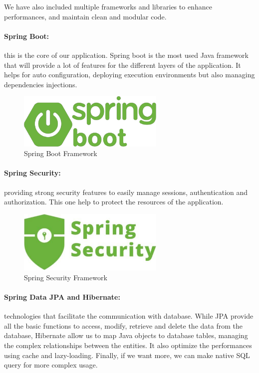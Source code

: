 \documentclass[12pt,a4paper,table,english]{article}
\begin{document}
	We have also included multiple frameworks and libraries to enhance performances, and maintain clean and modular code.\\
	
	\paragraph{Spring Boot:} this is the core of our application. Spring boot is the most used Java framework that will provide a lot of features for the different layers of the application. It helps for auto configuration, deploying execution environments but also managing dependencies injections.
	
		
	\begin{figure}[H]
		\centering
		\includegraphics[width=70mm]{Image/springboot}
		\caption{Spring Boot Framework}
		\label{fig:Spring Boot Framework}
	\end{figure}
	
	
	\paragraph{Spring Security:} providing strong security features to easily manage sessions, authentication and authorization. This one help to protect the resources of the application.
	
	\begin{figure}[H]
		\centering
		\includegraphics[width=70mm]{Image/springsecurity}
		\caption{Spring Security Framework}
		\label{fig:Spring Security Framework}
	\end{figure}
	
	\paragraph{Spring Data JPA and Hibernate:} technologies that facilitate the communication with database. While JPA provide all the basic functions \citep{JPA2, JPA1} to access, modify, retrieve and delete the data from the database, Hibernate allow us to map Java objects to database tables, managing the complex relationships between the entities. It also optimize the performances using cache and lazy-loading. Finally, if we want more, we can make native SQL query \citep{JPA3} for more complex usage.
	
\end{document}
